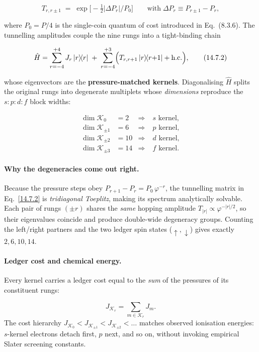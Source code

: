 \documentclass[11pt,oneside]{book}
\begin{document}
\[
T_{r,r\pm1}
\;=\;
\exp\!\bigl[-\tfrac12|\Delta P_{r}|/P_{0}\bigr]
\qquad
\text{with}\;
\Delta P_{r}\equiv P_{r\pm1}-P_{r},
\tag{14.7.1}
\]

where \(P_{0}=P/4\) is the single-coin quantum of cost
introduced in Eq.~(8.3.6).  The tunnelling amplitudes couple the nine
rungs into a tight-binding chain

\[
\hat H
=
\sum_{r=-4}^{+4} J_{r}\,|r\rangle\!\langle r|
\;+\;
\sum_{r=-4}^{+3}
\Bigl(
  T_{r,r+1}\,|r\rangle\!\langle r{+}1|
  +\text{h.c.}
\Bigr),
\tag{14.7.2}
\]

whose eigenvectors are the \textbf{pressure-matched kernels}.
Diagonalising \(\hat H\) splits the original rungs into degenerate
multiplets whose \emph{dimensions} reproduce the
\(s\!:\!p\!:\!d\!:\!f\) block widths:

\begin{align*}
\dim\mathcal K_{0} &= 2  &\Longrightarrow&\; s \text{ kernel},\\
\dim\mathcal K_{\pm1} &= 6 &\Longrightarrow&\; p \text{ kernel},\\
\dim\mathcal K_{\pm2} &= 10 &\Longrightarrow&\; d \text{ kernel},\\
\dim\mathcal K_{\pm3} &= 14 &\Longrightarrow&\; f \text{ kernel}.
\tag{14.7.3}
\end{align*}

\paragraph*{Why the degeneracies come out right.}
Because the pressure steps obey
\(P_{r+1}-P_{r}=P_{0}\,\varphi^{-r}\),
the tunnelling matrix in Eq.~\eqref{14.7.2} is \emph{tridiagonal
Toeplitz}, making its spectrum analytically solvable.  Each pair of
rungs \((\pm r)\) shares the \emph{same} hopping amplitude
\(T_{|r|}\propto\varphi^{-|r|/2}\), so their eigenvalues coincide and
produce double-wide degeneracy groups.  Counting the left/right
partners and the two ledger spin states (\(\uparrow,\downarrow\))
gives exactly \(2,6,10,14\).

\paragraph*{Ledger cost and chemical energy.}
Every kernel carries a ledger cost equal to the \emph{sum} of the
pressures of its constituent rungs:

\[
J_{\mathcal K_{r}} = \sum_{m\in\mathcal K_{r}} J_{m}.
\tag{14.7.4}
\]
The cost hierarchy
\(J_{\mathcal K_{0}} < J_{\mathcal K_{\pm1}} < J_{\mathcal K_{\pm2}} < \dots\)
matches observed ionisation energies:
\(s\)-kernel electrons detach first, \(p\) next, and so on,
without invoking empirical Slater screening constants.
\end{document}
